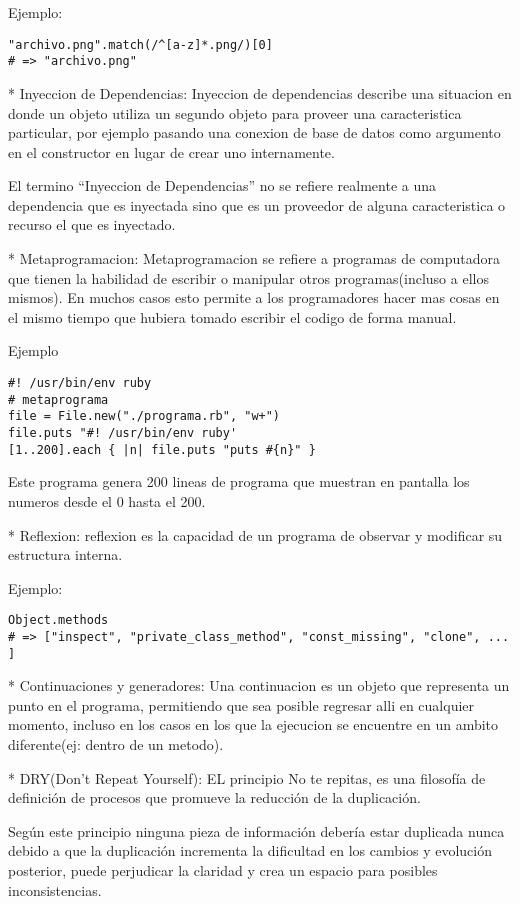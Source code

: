 Ejemplo:

\begin{verbatim}
"archivo.png".match(/^[a-z]*.png/)[0]
# => "archivo.png"
\end{verbatim}

* Inyeccion de Dependencias: Inyeccion de dependencias describe una situacion en donde un objeto utiliza un segundo objeto para proveer una caracteristica particular, por ejemplo pasando una conexion de base de datos como argumento en el constructor en lugar de crear uno internamente.

El termino ``Inyeccion de Dependencias'' no se refiere realmente a una dependencia que es inyectada sino que es un proveedor de alguna caracteristica o recurso el que es inyectado.

* Metaprogramacion: Metaprogramacion se refiere a programas de computadora que tienen la habilidad de escribir o manipular otros programas(incluso a ellos mismos). En muchos casos esto permite a los programadores hacer mas cosas en el mismo tiempo que hubiera tomado escribir el codigo de forma manual.

Ejemplo

\begin{verbatim}
#! /usr/bin/env ruby
# metaprograma
file = File.new("./programa.rb", "w+")
file.puts "#! /usr/bin/env ruby'
[1..200].each { |n| file.puts "puts #{n}" }
\end{verbatim}

Este programa genera 200 lineas de programa que muestran en pantalla los numeros desde el 0 hasta el 200.

* Reflexion: reflexion es la capacidad de un programa de observar y modificar su estructura interna.

Ejemplo:

\begin{verbatim}
Object.methods
# => ["inspect", "private_class_method", "const_missing", "clone", ... ]
\end{verbatim}

* Continuaciones y generadores: Una continuacion es un objeto que representa un punto en el programa, permitiendo que sea posible regresar alli en cualquier momento, incluso en los casos en los que la ejecucion se encuentre en un ambito diferente(ej: dentro de un metodo).

* DRY(Don't Repeat Yourself): EL principio No te repitas, es una filosofía de definición de procesos que promueve la reducción de la duplicación.

Según este principio ninguna pieza de información debería estar duplicada nunca debido a que la duplicación incrementa la dificultad en los cambios y evolución posterior, puede perjudicar la claridad y crea un espacio para posibles inconsistencias.

